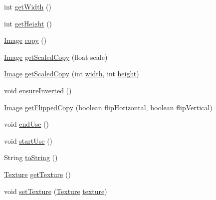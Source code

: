 \begin{DoxyCompactItemize}
\item 
int \mbox{\hyperlink{classorg_1_1newdawn_1_1slick_1_1_image_a94a5d32276e8a27930480223c5d69e11}{get\+Width}} ()
\item 
int \mbox{\hyperlink{classorg_1_1newdawn_1_1slick_1_1_image_aa2594a93f5126f60ad8a72444fceee98}{get\+Height}} ()
\item 
\mbox{\hyperlink{classorg_1_1newdawn_1_1slick_1_1_image}{Image}} \mbox{\hyperlink{classorg_1_1newdawn_1_1slick_1_1_image_a1a60f42d060227bc270a1a254eb36639}{copy}} ()
\item 
\mbox{\hyperlink{classorg_1_1newdawn_1_1slick_1_1_image}{Image}} \mbox{\hyperlink{classorg_1_1newdawn_1_1slick_1_1_image_a833a212bc085047713ad21dc246844e9}{get\+Scaled\+Copy}} (float scale)
\item 
\mbox{\hyperlink{classorg_1_1newdawn_1_1slick_1_1_image}{Image}} \mbox{\hyperlink{classorg_1_1newdawn_1_1slick_1_1_image_ae5bec579000a87804bff4421c8b0d020}{get\+Scaled\+Copy}} (int \mbox{\hyperlink{classorg_1_1newdawn_1_1slick_1_1_image_a7d02c85e21b388428cfe5cc5c82714a1}{width}}, int \mbox{\hyperlink{classorg_1_1newdawn_1_1slick_1_1_image_a54397a37823bc59ddc79ec70dc5cf226}{height}})
\item 
void \mbox{\hyperlink{classorg_1_1newdawn_1_1slick_1_1_image_a7587492a98997703485233d2feed2339}{ensure\+Inverted}} ()
\item 
\mbox{\hyperlink{classorg_1_1newdawn_1_1slick_1_1_image}{Image}} \mbox{\hyperlink{classorg_1_1newdawn_1_1slick_1_1_image_a60ce67f944bd70ef4ed9716974db74f1}{get\+Flipped\+Copy}} (boolean flip\+Horizontal, boolean flip\+Vertical)
\item 
void \mbox{\hyperlink{classorg_1_1newdawn_1_1slick_1_1_image_a2506df1ee54d606232317b20c29b6db5}{end\+Use}} ()
\item 
void \mbox{\hyperlink{classorg_1_1newdawn_1_1slick_1_1_image_a6c7c3f31d0a0a4c73026c8dac8dec7d2}{start\+Use}} ()
\item 
String \mbox{\hyperlink{classorg_1_1newdawn_1_1slick_1_1_image_ab61e19db4aef03043c0f0747e004e390}{to\+String}} ()
\item 
\mbox{\hyperlink{interfaceorg_1_1newdawn_1_1slick_1_1opengl_1_1_texture}{Texture}} \mbox{\hyperlink{classorg_1_1newdawn_1_1slick_1_1_image_a9c033386a3dcbb5e2f2ae2354e06d5bd}{get\+Texture}} ()
\item 
void \mbox{\hyperlink{classorg_1_1newdawn_1_1slick_1_1_image_a73b8afaa9bb100680f5bec87f4a75cdb}{set\+Texture}} (\mbox{\hyperlink{interfaceorg_1_1newdawn_1_1slick_1_1opengl_1_1_texture}{Texture}} \mbox{\hyperlink{classorg_1_1newdawn_1_1slick_1_1_image_a9fd9ddb21247305c83ac4e37d9d51f79}{texture}})

\end{DoxyCompactItemize}
